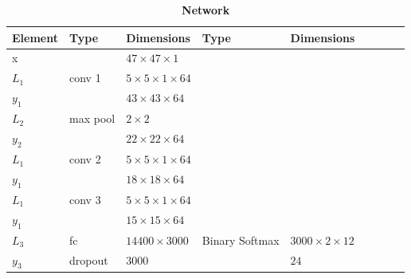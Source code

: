 \begin{table}[h!]
	\centering
	\caption*{\textbf{Network \networkIV}}
	{\footnotesize
		\begin{tabular}{|lllllllll|}
			\hline
			\multicolumn{1}{|l|}{Element} & Type             & \multicolumn{1}{l|}{Dimensions}                  & Type           & \multicolumn{1}{l|}{Dimensions}            \\ \hline
			\multicolumn{1}{|l|}{x}       &                  & \multicolumn{1}{l|}{$47\times47\times1$}         &                & \multicolumn{1}{l|}{}                      \\ \hline

			\multicolumn{1}{|l|}{$L_1$}   & conv 1           & \multicolumn{1}{l|}{$5\times 5\times1\times 64$} &                & \multicolumn{1}{l|}{}                      \\
			\multicolumn{1}{|l|}{$y_1$}   &                  & \multicolumn{1}{l|}{$43\times43\times64$}        &                & \multicolumn{1}{l|}{}                      \\ \hline

			\multicolumn{1}{|l|}{$L_2$}   & max pool         & \multicolumn{1}{l|}{$2\times 2$}                 &                & \multicolumn{1}{l|}{}                      \\
			\multicolumn{1}{|l|}{$y_2$}   &                  & \multicolumn{1}{l|}{$22\times22\times 64$}       &                & \multicolumn{1}{l|}{}                      \\ \hline

			\multicolumn{1}{|l|}{$L_1$}   & conv 2           & \multicolumn{1}{l|}{$5\times 5\times1\times 64$} &                & \multicolumn{1}{l|}{}                      \\
			\multicolumn{1}{|l|}{$y_1$}   &                  & \multicolumn{1}{l|}{$18\times18\times64$}        &                & \multicolumn{1}{l|}{}                      \\ \hline

			\multicolumn{1}{|l|}{$L_1$}   & conv 3           & \multicolumn{1}{l|}{$5\times 5\times1\times 64$} &                & \multicolumn{1}{l|}{}                      \\
			\multicolumn{1}{|l|}{$y_1$}   &                  & \multicolumn{1}{l|}{$15\times15\times64$}        &                & \multicolumn{1}{l|}{}                      \\ \hline

			\multicolumn{1}{|l|}{$L_3$}   & fc               & \multicolumn{1}{l|}{$14400\times3000$}           & Binary Softmax & \multicolumn{1}{l|}{$3000\times2\times12$} \\
			\multicolumn{1}{|l|}{$y_3$}   & dropout          & \multicolumn{1}{l|}{$3000$}                      &                & \multicolumn{1}{l|}{$24$}                  \\ \hline


\end{tabular}}
\end{table}
